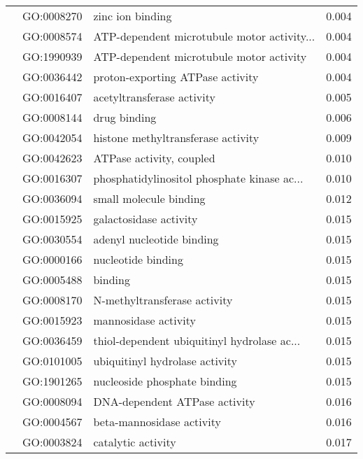 \begin{longtable}{lllr}
   & GO:0008270 &                             zinc ion binding &         0.004 \\
   & GO:0008574 &  ATP-dependent microtubule motor activity... &         0.004 \\
   & GO:1990939 &     ATP-dependent microtubule motor activity &         0.004 \\
   & GO:0036442 &             proton-exporting ATPase activity &         0.004 \\
   & GO:0016407 &                   acetyltransferase activity &         0.005 \\
   & GO:0008144 &                                 drug binding &         0.006 \\
   & GO:0042054 &           histone methyltransferase activity &         0.009 \\
   & GO:0042623 &                     ATPase activity, coupled &         0.010 \\
   & GO:0016307 &  phosphatidylinositol phosphate kinase ac... &         0.010 \\
   & GO:0036094 &                       small molecule binding &         0.012 \\
   & GO:0015925 &                       galactosidase activity &         0.015 \\
   & GO:0030554 &                    adenyl nucleotide binding &         0.015 \\
   & GO:0000166 &                           nucleotide binding &         0.015 \\
   & GO:0005488 &                                      binding &         0.015 \\
   & GO:0008170 &                 N-methyltransferase activity &         0.015 \\
   & GO:0015923 &                         mannosidase activity &         0.015 \\
   & GO:0036459 &  thiol-dependent ubiquitinyl hydrolase ac... &         0.015 \\
   & GO:0101005 &               ubiquitinyl hydrolase activity &         0.015 \\
   & GO:1901265 &                 nucleoside phosphate binding &         0.015 \\
   & GO:0008094 &                DNA-dependent ATPase activity &         0.016 \\
   & GO:0004567 &                    beta-mannosidase activity &         0.016 \\
   & GO:0003824 &                           catalytic activity &         0.017 \\

\end{longtable}
